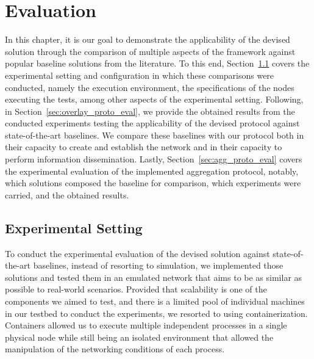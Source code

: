 

\chapter{Evaluation}
\label{cha:evaluation}

In this chapter, it is our goal to demonstrate the applicability of the devised solution through the comparison of multiple aspects of the framework against popular baseline solutions from the literature. To this end, Section~\ref{sec:exp_setting_conf} covers the experimental setting and configuration in which these comparisons were conducted, namely the execution environment, the specifications of the nodes executing the tests, among other aspects of the experimental setting. Following, in Section~\ref{sec:overlay_proto_eval}, we provide the obtained results from the conducted experiments testing the applicability of the devised protocol against state-of-the-art baselines. We compare these baselines with our protocol both in their capacity to create and establish the network and in their capacity to perform information dissemination. Lastly, Section~\ref{sec:agg_proto_eval} covers the experimental evaluation of the implemented aggregation protocol, notably, which solutions composed the baseline for comparison, which experiments were carried, and the obtained results.

\section{Experimental Setting} \label{sec:exp_setting_conf}

To conduct the experimental evaluation of the devised solution against state-of-the-art baselines, instead of resorting to simulation, we implemented those solutions and tested them in an emulated network that aims to be as similar as possible to real-world scenarios. Provided that scalability is one of the components we aimed to test, and there is a limited pool of individual machines in our testbed to conduct the experiments, we resorted to using containerization. Containers allowed us to execute multiple independent processes in a single physical node while still being an isolated environment that allowed the manipulation of the networking conditions of each process. 

